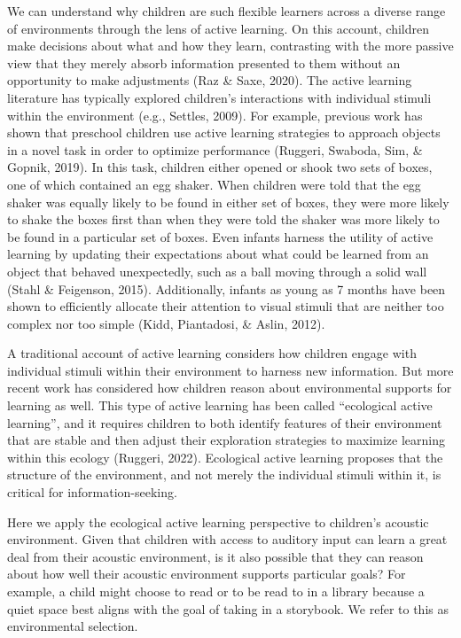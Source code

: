 \documentclass[10pt, letterpaper]{article}
\begin{document}
We can understand why children are such flexible learners across a
diverse range of environments through the lens of active learning. On
this account, children make decisions about what and how they learn,
contrasting with the more passive view that they merely absorb
information presented to them without an opportunity to make adjustments
(Raz \& Saxe, 2020). The active learning literature has typically
explored children's interactions with individual stimuli within the
environment (e.g., Settles, 2009). For example, previous work has shown
that preschool children use active learning strategies to approach
objects in a novel task in order to optimize performance (Ruggeri,
Swaboda, Sim, \& Gopnik, 2019). In this task, children either opened or
shook two sets of boxes, one of which contained an egg shaker. When
children were told that the egg shaker was equally likely to be found in
either set of boxes, they were more likely to shake the boxes first than
when they were told the shaker was more likely to be found in a
particular set of boxes. Even infants harness the utility of active
learning by updating their expectations about what could be learned from
an object that behaved unexpectedly, such as a ball moving through a
solid wall (Stahl \& Feigenson, 2015). Additionally, infants as young as
7 months have been shown to efficiently allocate their attention to
visual stimuli that are neither too complex nor too simple (Kidd,
Piantadosi, \& Aslin, 2012).

A traditional account of active learning considers how children engage
with individual stimuli within their environment to harness new
information. But more recent work has considered how children reason
about environmental supports for learning as well. This type of active
learning has been called ``ecological active learning'', and it requires
children to both identify features of their environment that are stable
and then adjust their exploration strategies to maximize learning within
this ecology (Ruggeri, 2022). Ecological active learning proposes that
the structure of the environment, and not merely the individual stimuli
within it, is critical for information-seeking.

Here we apply the ecological active learning perspective to children's
acoustic environment. Given that children with access to auditory input
can learn a great deal from their acoustic environment, is it also
possible that they can reason about how well their acoustic environment
supports particular goals? For example, a child might choose to read or
to be read to in a library because a quiet space best aligns with the
goal of taking in a storybook. We refer to this as environmental
selection.
\end{document}
